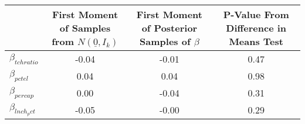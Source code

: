 \begin{tabular}{lccc}
\toprule
 & First Moment of Samples from $N(\underline{0}, I_k)$ & First Moment of Posterior Samples of $\beta$ & P-Value From Difference in Means Test \\
\midrule
$\beta_{tchratio}$ & -0.04 & -0.01 & 0.47 \\
$\beta_{pctel}$ & 0.04 & 0.04 & 0.98 \\
$\beta_{percap}$ & 0.00 & -0.04 & 0.31 \\
$\beta_{lnch_pct}$ & -0.05 & -0.00 & 0.29 \\
\bottomrule
\end{tabular}

